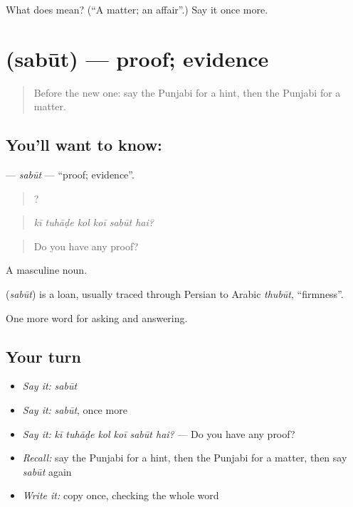 \begin{tcolorbox}[breakable,colback=teal!4,colframe=teal!35!black,title={Before you move on}]
What does  mean? (\textquotedblleft{}A matter; an affair\textquotedblright{}.) Say it once more.
\end{tcolorbox}
\section[\texorpdfstring{\pa{ਸਬੂਤ} (sabūt)}{ਸਬੂਤ (sabūt)}]{ (sabūt) — proof; evidence}

\label{lesson:PA-C343-sabut}



\begin{quote}
Before the new one: say the Punjabi for a hint, then the Punjabi for a matter.
\end{quote}

\subsection*{You'll want to know: }
\textbf{} — \emph{sabūt} — \textquotedblleft{}proof; evidence\textquotedblright{}.

\begin{quote}
     ?
\end{quote}

\begin{quote}
\emph{kī tuhāḍe kol koī sabūt hai?}
\end{quote}

\begin{quote}
Do you have any proof?
\end{quote}

A masculine noun.

\begin{cousinweb}
\textbf{} (\emph{sabūt}) is a loan, usually traced through Persian to Arabic \emph{thubūt}, \textquotedblleft{}firmness\textquotedblright{}.
\end{cousinweb}

\begin{grammarlens}[title={What you've built}]
One more word for asking and answering.
\end{grammarlens}

\subsection*{Your turn}
\begin{itemize}
\raggedright
  \item \emph{Say it:} \emph{sabūt}
  \item \emph{Say it:} \emph{sabūt}, once more
  \item \emph{Say it:} \emph{kī tuhāḍe kol koī sabūt hai?} — Do you have any proof?
  \item \emph{Recall:} say the Punjabi for a hint, then the Punjabi for a matter, then say \emph{sabūt} again
  \item \emph{Write it:} copy \textbf{} once, checking the whole word
\end{itemize}

